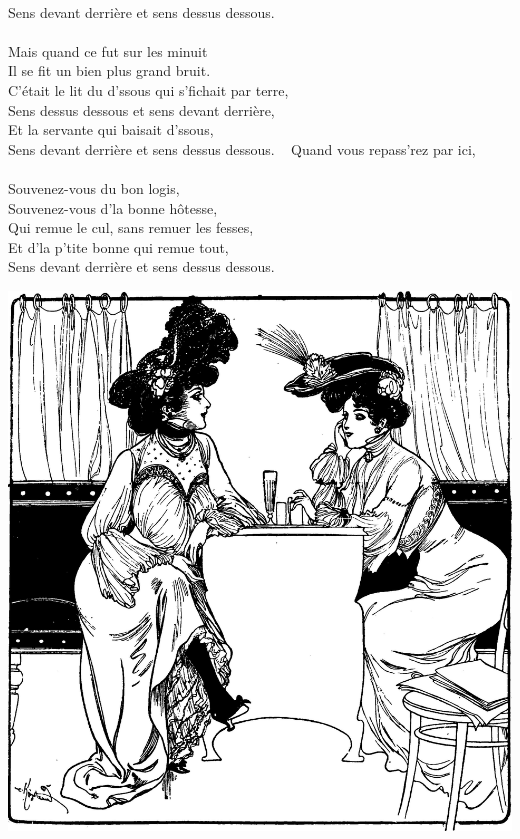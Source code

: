 \\Sens devant derrière et sens dessus dessous. \bissimple
\\\\Mais quand ce fut sur les minuit ~~~~~~~~~~~~~~~\bissimple
\\Il se fit un bien plus grand bruit. ~~~~~~~~~~~~~\bissimple
\\C'était le lit du d'ssous qui s'fichait par terre,
\\Sens dessus dessous et sens devant derrière,
\\Et la servante qui baisait d'ssous,
\\Sens devant derrière et sens dessus dessous. ~ \bissimple
\breakpage
Quand vous repass'rez par ici, ~~~~~~~~~~~~~~~~\bissimple
\\Souvenez-vous du bon logis, ~~~~~~~~~~~~~~~\bissimple
\\Souvenez-vous d'la bonne hôtesse,
\\Qui remue le cul, sans remuer les fesses,
\\Et d'la p'tite bonne qui remue tout,
\\Sens devant derrière et sens dessus dessous. \bissimple
\\
\bigskip
\begin{center}
\includegraphics[width=1\textwidth]{images/brev3.png}
\end{center}

\breakpage